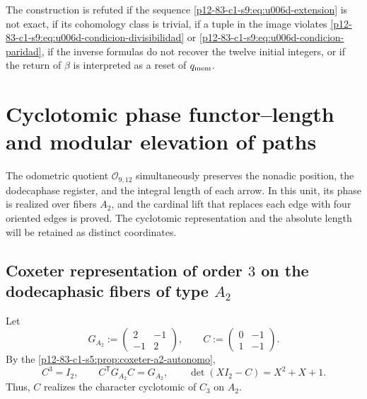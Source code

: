 {\begin{criterion}
\label{p12-83-c1-s9:crit:u006d-refutacion}
The construction is refuted if the sequence
\eqref{p12-83-c1-s9:eq:u006d-extension} is not exact, if its cohomology class is
trivial, if a tuple in the image violates
\eqref{p12-83-c1-s9:eq:u006d-condicion-divisibilidad} or
\eqref{p12-83-c1-s9:eq:u006d-condicion-paridad}, if the inverse formulas do not recover
the twelve initial integers, or if the return of \(\beta\) is interpreted as a
reset of \(q_{\rm mem}\).
\end{criterion}



\section{Cyclotomic phase functor--length and modular elevation of paths}
\label{p12-83-c1-s10:chap:funtor-ciclotomico-elevacion-caminos}

The odometric quotient \(\mathcal O_{9,12}\) simultaneously preserves the nonadic position, the dodecaphase register, and the integral length of each arrow. In this unit, its phase is realized over fibers \(A_2\), and the cardinal lift that replaces each edge with four oriented edges is proved. The cyclotomic representation and the absolute length will be retained as distinct coordinates.

\subsection{Coxeter representation of order \(3\) on the dodecaphasic fibers of type \(A_2\)}

Let
\begin{equation}
 G_{A_2}:=
 \begin{pmatrix}2&-1\\-1&2\end{pmatrix},
 \qquad
 C:=
 \begin{pmatrix}0&-1\\1&-1\end{pmatrix}.
 \label{p12-83-c1-s10:eq:u006b-dato-coxeter}
\end{equation}
By the \cref{p12-83-c1-s5:prop:coxeter-a2-autonomo},
\begin{equation}
 C^3=I_2,
 \qquad
 C^{\mathsf T}G_{A_2}C=G_{A_2},
 \qquad
 \det(XI_2-C)=X^2+X+1.
 \label{p12-83-c1-s10:eq:u006b-identidades-coxeter}
\end{equation}
Thus, \(C\) realizes the character cyclotomic of \(C_3\) on \(A_2\).

}
